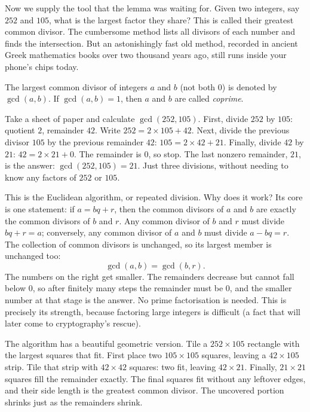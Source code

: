 Now we supply the tool that the lemma was waiting for. Given two integers, say $252$ and $105$, what is the largest factor they share? This is called their greatest common divisor. The cumbersome method lists all divisors of each number and finds the intersection. But an astonishingly fast old method, recorded in ancient Greek mathematics books over two thousand years ago, still runs inside your phone's chips today.

\begin{dingyi}
The largest common divisor of integers $a$ and $b$ (not both $0$) is denoted by $\gcd(a,b)$. If $\gcd(a,b)=1$, then $a$ and $b$ are called \emph{coprime}.
\end{dingyi}

\begin{shiyan}
Take a sheet of paper and calculate $\gcd(252,105)$. First, divide $252$ by $105$: quotient $2$, remainder $42$. Write $252=2\times105+42$. Next, divide the previous divisor $105$ by the previous remainder $42$: $105=2\times42+21$. Finally, divide $42$ by $21$: $42=2\times21+0$. The remainder is $0$, so stop. The last nonzero remainder, $21$, is the answer: $\gcd(252,105)=21$. Just three divisions, without needing to know any factors of $252$ or $105$.
\end{shiyan}

This is the Euclidean algorithm, or repeated division. Why does it work? Its core is one statement: if $a=bq+r$, then the common divisors of $a$ and $b$ are exactly the common divisors of $b$ and $r$. Any common divisor of $b$ and $r$ must divide $bq+r=a$; conversely, any common divisor of $a$ and $b$ must divide $a-bq=r$. The collection of common divisors is unchanged, so its largest member is unchanged too:
\[
\gcd(a,b)=\gcd(b,r).
\]
The numbers on the right get smaller. The remainders decrease but cannot fall below $0$, so after finitely many steps the remainder must be $0$, and the smaller number at that stage is the answer. No prime factorisation is needed. This is precisely its strength, because factoring large integers is difficult (a fact that will later come to cryptography's rescue).

The algorithm has a beautiful geometric version. Tile a $252\times 105$ rectangle with the largest squares that fit. First place two $105\times 105$ squares, leaving a $42\times 105$ strip. Tile that strip with $42\times 42$ squares: two fit, leaving $42\times 21$. Finally, $21\times 21$ squares fill the remainder exactly. The final squares fit without any leftover edges, and their side length is the greatest common divisor. The uncovered portion shrinks just as the remainders shrink.

